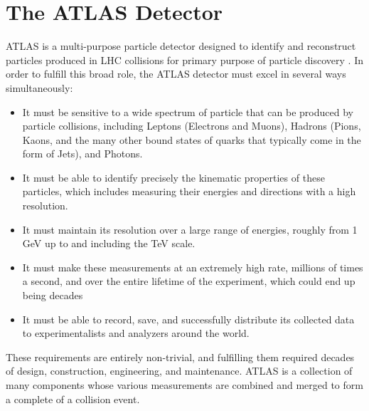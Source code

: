 %
%
%

\section{The ATLAS Detector}
ATLAS is a multi-purpose particle detector designed to identify and reconstruct particles produced in LHC collisions for primary purpose of particle discovery \cite{ATLAS_TDR}.
In order to fulfill this broad role, the ATLAS detector must excel in several ways simultaneously:

\begin{itemize}
  \item It must be sensitive to a wide spectrum of particle that can be produced by particle collisions, including Leptons (Electrons and Muons), Hadrons (Pions, Kaons, and the many other bound states of quarks that typically come in the form of Jets), and Photons.
  \item It must be able to identify precisely the kinematic properties of these particles, which includes measuring their energies and directions with a high resolution.
  \item It must maintain its resolution over a large range of energies, roughly from 1 GeV up to and including the TeV scale.
  \item It must make these measurements at an extremely high rate, millions of times a second, and over the entire lifetime of the experiment, which could end up being decades
  \item It must be able to record, save, and successfully distribute its collected data to experimentalists and analyzers around the world.
\end{itemize}

These requirements are entirely non-trivial, and fulfilling them required decades of design, construction, engineering, and maintenance.  
ATLAS is a collection of many components whose various measurements are combined and merged to form a complete of a collision event.




